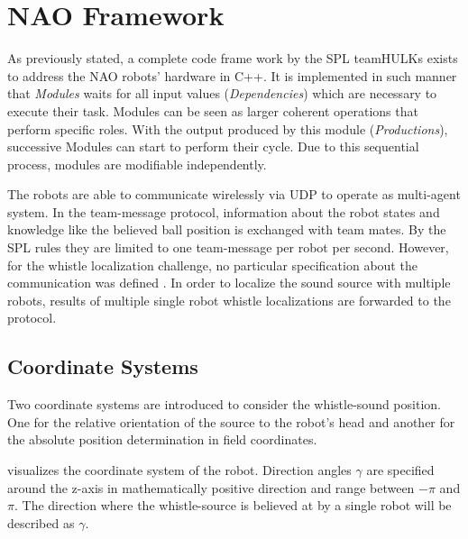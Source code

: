 \section{NAO Framework}
\label{sec:03_naoFramework}

As previously stated, a complete code frame work by the SPL teamHULKs exists to address
the NAO robots' hardware in C++.
It is implemented in such manner that \textit{Modules}   waits for all input
values (\textit{Dependencies}) which are necessary to execute their task.
Modules can be seen as larger coherent operations that perform specific roles.
With the output produced by this module (\textit{Productions}), successive
Modules can start to perform their cycle.
Due to this sequential process, modules are modifiable independently. 

The robots are able to communicate wirelessly via \ac{UDP} to operate as
multi-agent system.
In the team-message protocol, information about the robot states and
knowledge like the believed ball position is exchanged with team mates.
By the \ac{SPL} rules \cite{rules} they are limited to one team-message per
robot per second.
However, for the whistle localization challenge, no particular specification
about the communication was defined \cite{technical_challenge}.
In order to localize the sound source with multiple robots, results of multiple
single robot whistle localizations are forwarded to the protocol.

\subsection{Coordinate Systems}
\label{subsec:03_coordinates}

Two coordinate systems are introduced to consider the whistle-sound position.
One for the relative orientation of the source to the robot's head and another
for the absolute position determination in field coordinates.

 visualizes the coordinate system of the
robot.
Direction angles $\gamma$ are specified around the z-axis in
mathematically positive direction and range between $-\pi$ and $\pi$.
The direction where the whistle-source is believed at by a single robot
will be described as $\gamma$.

